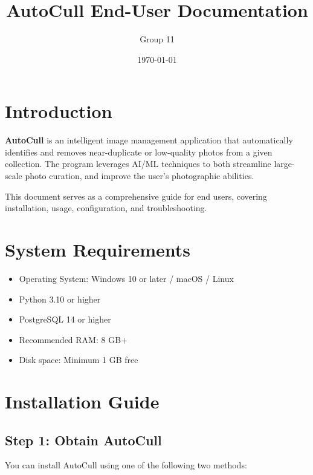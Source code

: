 \documentclass[12pt,a4paper]{article}
\title{\textbf{AutoCull End-User Documentation}}
\author{Group 11}
\date{\today}
\begin{document}
\maketitle
\tableofcontents
\newpage

\section{Introduction}

\textbf{AutoCull} is an intelligent image management application that automatically identifies and removes near-duplicate or low-quality photos from a given collection. The program leverages AI/ML techniques to both streamline large-scale photo curation, and improve the user's photographic abilities.

This document serves as a comprehensive guide for end users, covering installation, usage, configuration, and troubleshooting.

\section{System Requirements}

\begin{itemize}
    \item Operating System: Windows 10 or later / macOS / Linux
    \item Python 3.10 or higher
    \item PostgreSQL 14 or higher
    \item Recommended RAM: 8 GB+
    \item Disk space: Minimum 1 GB free
\end{itemize}


\section{Installation Guide}

\subsection{Step 1: Obtain AutoCull}

You can install AutoCull using one of the following two methods:
\end{document}
